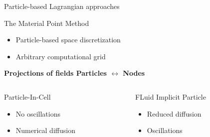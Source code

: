 \begin{withoutheadline}
  \begin{frame}{Particle-based Lagrangian approaches}
    
    \begin{block}{The Material Point Method \cite{Sulsky94}}
      \begin{footnotesize}
        \begin{itemize}
        \item Particle-based space discretization
        \item Arbitrary computational grid
        \end{itemize}
      \end{footnotesize}
      
      \centering
      \textbf{Projections of fields Particles $\leftrightarrow$ Nodes}
    \end{block}

    \begin{columns}
      \begin{column}{0.48\textwidth}
        \begin{block}{\footnotesize Particle-In-Cell \cite{PIC}}
          \begin{footnotesize}
            \begin{itemize}
            \item[] No oscillations 
            \item[] Numerical diffusion
            \end{itemize}
          \end{footnotesize}
        \end{block}
      \end{column}
      \begin{column}{0.48\textwidth}
        \begin{block}{\footnotesize FLuid Implicit Particle \cite{PIC_Nishiguchi}}
          \begin{footnotesize}
            \begin{itemize}
            \item[] Reduced diffusion 
            \item[] Oscillations
            \end{itemize}
          \end{footnotesize}
        \end{block}
      \end{column}
    \end{columns}
    \vspace{-0.3cm}
  \end{frame}
\end{withoutheadline}

